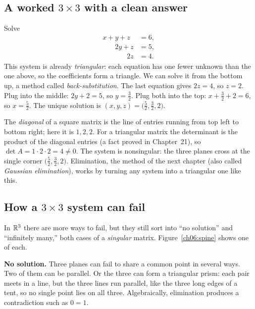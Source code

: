 \subsection{A worked $3\times3$ with a clean answer}

\begin{example}
\label{ch06:ex-3x3}
Solve
\[
  \begin{aligned}
    x + y + z &= 6,\\
    \phantom{x +{}} 2y + z &= 5,\\
    \phantom{x + y +{}} 2z &= 4.
  \end{aligned}
\]
This system is already \emph{triangular}: each equation has one fewer
unknown than the one above, so the coefficients form a triangle. We can
solve it from the bottom up, a method called \emph{back-substitution}. The
last equation gives $2z=4$, so
$z=2$. Plug into the middle: $2y+2=5$, so $y=\tfrac32$. Plug both into the
top: $x+\tfrac32+2=6$, so $x=\tfrac52$. The unique solution is
$(x,y,z)=\bigl(\tfrac52,\tfrac32,2\bigr)$.

The \emph{diagonal} of a square matrix is the line of entries running from
top left to bottom right; here it is $1,2,2$. For a triangular matrix the
determinant is the product of the diagonal entries (a fact proved in
Chapter~21), so $\det A = 1\cdot2\cdot2=4\neq0$. The system is nonsingular:
the three planes cross at the single corner
$\bigl(\tfrac52,\tfrac32,2\bigr)$. Elimination, the method of the next
chapter (also called \emph{Gaussian elimination}), works by turning any
system into a triangular one like this.
\end{example}

\subsection{How a $3\times3$ system can fail}

In $\mathbb{R}^3$ there are more ways to fail, but they still sort into ``no
solution'' and ``infinitely many,'' both cases of a \emph{singular} matrix.
Figure~\ref{ch06:spine} shows one of each.

\textbf{No solution.} Three planes can fail to share a common point in
several ways. Two of them can be parallel. Or the three can form a
triangular prism: each pair meets in a line, but the three lines run
parallel, like the three long edges of a tent, so no single point
lies on all three. Algebraically, elimination produces a contradiction such
as $0=1$.


